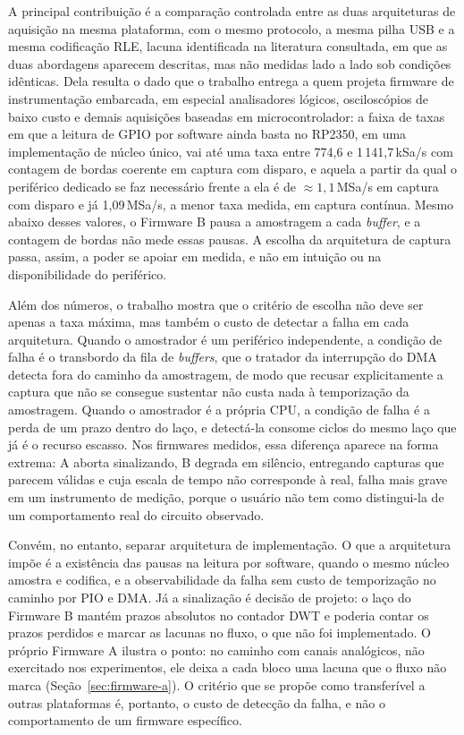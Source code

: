 A principal contribuição é a comparação controlada entre as duas arquiteturas
de aquisição na mesma plataforma, com o mesmo protocolo, a mesma pilha \ac{USB}
e a mesma codificação \ac{RLE}, lacuna identificada na literatura consultada,
em que as duas abordagens aparecem descritas, mas não medidas lado a lado sob
condições idênticas. Dela resulta o dado que o trabalho entrega a quem projeta
firmware de instrumentação embarcada, em especial analisadores lógicos,
osciloscópios de baixo custo e demais aquisições baseadas em microcontrolador:
a faixa de taxas em que a leitura de \ac{GPIO} por software ainda basta no
RP2350, em uma implementação de núcleo único, vai até uma taxa entre 774,6 e
1\,141,7\,kSa/s com contagem de bordas coerente em captura com disparo, e
aquela a partir da qual o periférico dedicado se faz necessário frente a ela é
de $\approx 1{,}1$\,MSa/s em captura com disparo e já 1,09\,MSa/s, a menor
taxa medida, em captura contínua. Mesmo abaixo desses valores, o Firmware B
pausa a amostragem a cada \emph{buffer}, e a contagem de bordas não mede essas
pausas. A escolha da arquitetura de captura passa, assim, a poder se
apoiar em medida, e não em intuição ou na disponibilidade do periférico.

Além dos números, o trabalho mostra que o critério de escolha não deve ser
apenas a taxa máxima, mas também o custo de detectar a falha em cada
arquitetura. Quando o amostrador é um periférico independente, a condição de
falha é o transbordo da fila de \emph{buffers}, que o tratador da interrupção
do \ac{DMA} detecta fora do caminho da amostragem, de modo que recusar
explicitamente a captura que não se consegue sustentar não custa nada à
temporização da amostragem. Quando o amostrador é a própria \ac{CPU}, a condição de falha
é a perda de um prazo dentro do laço, e detectá-la consome ciclos do mesmo
laço que já é o recurso escasso. Nos firmwares medidos, essa diferença
aparece na forma extrema: A aborta sinalizando, B degrada em silêncio,
entregando capturas que parecem válidas e cuja escala de tempo não corresponde
à real, falha mais grave em um instrumento de medição, porque o usuário não tem
como distingui-la de um comportamento real do circuito observado.

Convém, no entanto, separar arquitetura de implementação. O que a arquitetura
impõe é a existência das pausas na leitura por software, quando o mesmo núcleo
amostra e codifica, e a observabilidade da falha sem custo de temporização no
caminho por \ac{PIO} e \ac{DMA}. Já a sinalização é decisão de projeto: o laço
do Firmware B mantém prazos absolutos no contador \ac{DWT} e poderia contar os
prazos perdidos e marcar as lacunas no fluxo, o que não foi implementado. O
próprio Firmware A ilustra o ponto: no caminho com canais analógicos, não
exercitado nos experimentos, ele deixa a cada bloco uma lacuna que o fluxo
não marca (Seção~\ref{sec:firmware-a}). O critério que se propõe como
transferível a outras plataformas é, portanto, o custo de detecção da falha, e
não o comportamento de um firmware específico.

